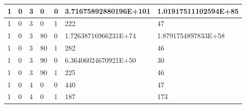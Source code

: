 \documentclass{article}
\theoremstyle{definition}
\begin{document}
\begin{table}[]
\begin{tabular}{|l|l|l|l|l|l|l|}
1                                      & 0                                       & 3                                      & 0                                    & 0                                      & 3.71675892880196E+101                    & 1.01917511102594E+85                   \\ \hline
1                                      & 0                                       & 3                                      & 0                                    & 1                                      & 222                                      & 47                                     \\ \hline
1                                      & 0                                       & 3                                      & 80                                   & 0                                      & 1.72638716966231E+74                     & 1.8791754897833E+58                    \\ \hline
1                                      & 0                                       & 3                                      & 80                                   & 1                                      & 282                                      & 46                                     \\ \hline
1                                      & 0                                       & 3                                      & 90                                   & 0                                      & 6.36406024670921E+50                     & 30                                     \\ \hline
1                                      & 0                                       & 3                                      & 90                                   & 1                                      & 225                                      & 46                                     \\ \hline
1                                      & 0                                       & 4                                      & 0                                    & 0                                      & 440                                      & 47                                     \\ \hline
1                                      & 0                                       & 4                                      & 0                                    & 1                                      & 187                                      & 173                                    \\ \hline

\end{tabular}
\end{table}
\end{document}
